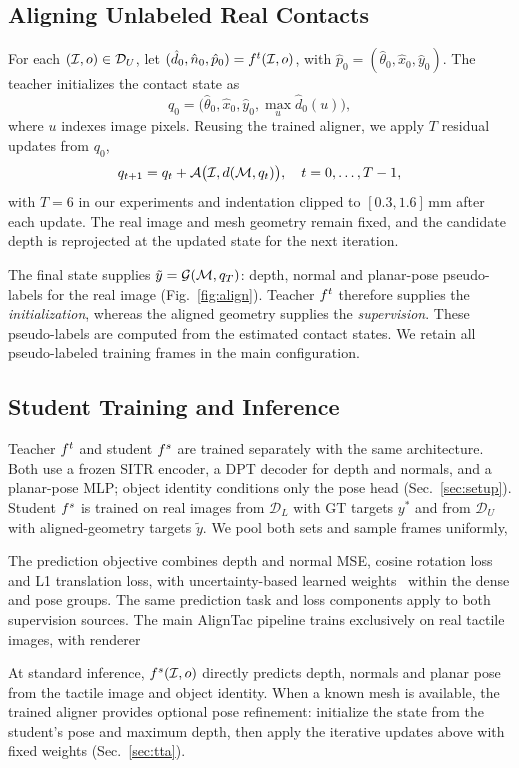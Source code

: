 \subsection{Aligning Unlabeled Real Contacts}
\label{sec:unlabeled_alignment}
For each $(\mathcal{I},o)\in\mathcal{D}_{U}$, let $(\hat d_0,\hat n_0,\hat p_0)=f^{t}(\mathcal{I},o)$, with $\hat p_0=(\hat\theta_0,\hat x_0,\hat y_0)$. The teacher initializes the contact state as
\begin{equation}
    q_0=\big(\hat\theta_0,\hat x_0,\hat y_0,\max_u\hat d_0(u)\big),
    \label{eq:teacher_initialization}
\end{equation}
where $u$ indexes image pixels. Reusing the trained aligner, we apply $T$ residual updates from $q_0$,
\begin{equation}
    q_{t+1}=q_t+\mathcal{A}\big(\mathcal{I},d(\mathcal{M},q_t)\big),\quad t=0,\ldots,T-1,
    \label{eq:alignment_updates}
\end{equation}
with $T=6$ in our experiments and indentation clipped to $[0.3,1.6]\,$mm after each update. The real image and mesh geometry remain fixed, and the candidate depth is reprojected at the updated state for the next iteration.

The final state supplies $\tilde y=\mathcal{G}(\mathcal{M},q_T)$: depth, normal and planar-pose pseudo-labels for the real image (Fig.~\ref{fig:align}). Teacher $f^{t}$ therefore supplies the \emph{initialization}, whereas the aligned geometry supplies the \emph{supervision}. These pseudo-labels are computed from the estimated contact states. We retain all pseudo-labeled training frames in the main configuration.

\subsection{Student Training and Inference}
\label{sec:student_training}
Teacher $f^{t}$ and student $f^{s}$ are trained separately with the same architecture. Both use a frozen SITR encoder, a DPT decoder for depth and normals, and a planar-pose MLP; object identity conditions only the pose head (Sec.~\ref{sec:setup}). Student $f^{s}$ is trained on real images from $\mathcal{D}_{L}$ with GT targets $y^\ast$ and from $\mathcal{D}_{U}$ with aligned-geometry targets $\tilde y$. We pool both sets and sample frames uniformly, 

The prediction objective combines depth and normal MSE, cosine rotation loss and L1 translation loss, with uncertainty-based learned weights~\cite{kendall2018multi} within the dense and pose groups. The same prediction task and loss components apply to both supervision sources. The main AlignTac pipeline trains exclusively on real tactile images, with renderer 

At standard inference, $f^{s}(\mathcal{I},o)$ directly predicts depth, normals and planar pose from the tactile image and object identity. When a known mesh is available, the trained aligner provides optional pose refinement: initialize the state from the student's pose and maximum depth, then apply the iterative updates above with fixed weights (Sec.~\ref{sec:tta}).
